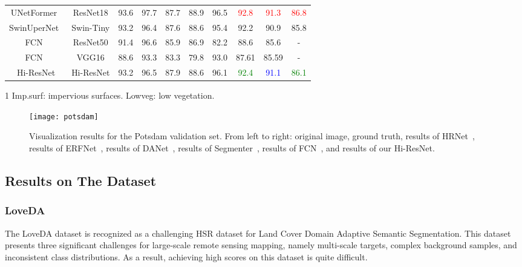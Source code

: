 \documentclass[journal]{IEEEtran}
\begin{document}
\begin{table*}[!t]
\begin{center}
\begin{threeparttable}
{\begin{tabular}{c|c c c c c c c c c}
      UNetFormer~\cite{wang2022unetformer} & ResNet18 & 93.6 & 97.7 & 87.7 & 88.9 & 96.5 & \textcolor{red}{92.8} & \textcolor{red}{91.3} & \textcolor{red}{86.8}\\
      SwinUperNet~\cite{liu2021swin} & Swin-Tiny & 93.2 & 96.4 & 87.6 & 88.6 & 95.4 & 92.2 & 90.9 & 85.8\\
      FCN~\cite{long2015fully} & ResNet50 & 91.4 & 96.6 & 85.9 & 86.9 & 82.2 & 88.6 & 85.6 & -\\
      FCN~\cite{long2015fully} & VGG16 & 88.6 & 93.3 & 83.3 & 79.8 & 93.0 & 87.61 & 85.59 & -\\
      \hline
      Hi-ResNet & Hi-ResNet & 93.2 & 96.5 & 87.9 & 88.6 & 96.1 & \textcolor{green}{92.4} & \textcolor{blue}{91.1} & \textcolor{green}{86.1}\\
      \hline
    \end{tabular}}
    \begin{tablenotes}
        \footnotesize  
        \item[1] Imp.surf: impervious surfaces. Lowveg: low vegetation. 
      \end{tablenotes} 
    \end{threeparttable}
  \end{center}
  \label{table:9}
\end{table*}

\begin{figure*}[t!]
    \centering
    \texttt{[image: potsdam]}
    \caption{Visualization results for the Potsdam validation set. From left to right: original image, ground truth, results of HRNet~\cite{wang2020deep}, results of ERFNet~\cite{romera2017erfnet}, results of DANet~\cite{fu2019dual}, results of Segmenter~\cite{strudel2021segmenter}, results of FCN~\cite{long2015fully}, and results of our Hi-ResNet.}
    \label{fig:potsdam}
\end{figure*}
\subsection{Results on The Dataset}
\subsubsection{LoveDA}
The LoveDA dataset is recognized as a challenging HSR dataset for Land Cover Domain Adaptive Semantic Segmentation. This dataset presents three significant challenges for large-scale remote sensing mapping, namely multi-scale targets, complex background samples, and inconsistent class distributions. As a result, achieving high scores on this dataset is quite difficult.
\end{document}
